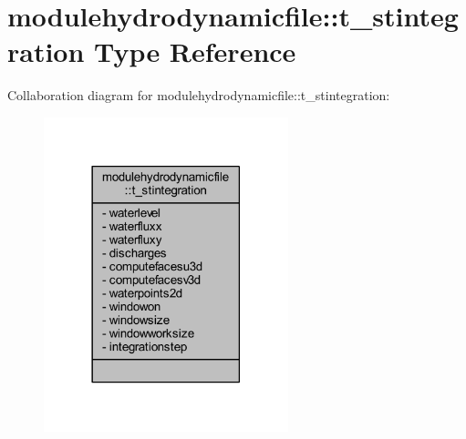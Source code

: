 \hypertarget{structmodulehydrodynamicfile_1_1t__stintegration}{}\section{modulehydrodynamicfile\+:\+:t\+\_\+stintegration Type Reference}
\label{structmodulehydrodynamicfile_1_1t__stintegration}


Collaboration diagram for modulehydrodynamicfile\+:\+:t\+\_\+stintegration\+:\nopagebreak
\begin{figure}[H]
\begin{center}
\leavevmode
\includegraphics[width=201pt]{structmodulehydrodynamicfile_1_1t__stintegration__coll__graph}
\end{center}
\end{figure}
